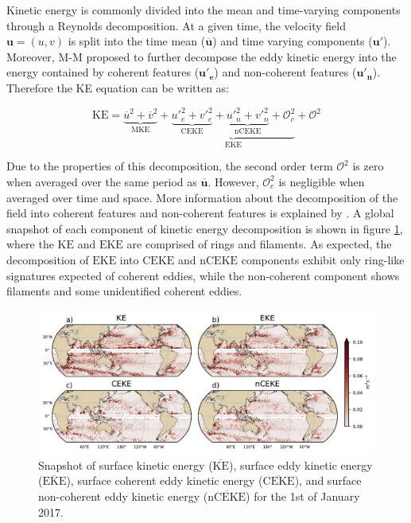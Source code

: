\documentclass[draft,linenumbers]{agujournal2019}
\newcommand{\MKE}{\overline{\textrm{KE}}}
\newcommand{\mKE}{\textrm{MKE}}
\newcommand{\KE}{\textrm{KE}}
\newcommand{\MEKE}{\overline{\textrm{EKE}}}
\newcommand{\EKE}{\textrm{EKE}}
\newcommand{\MCEKE}{\overline{\textrm{CEKE}}}
\newcommand{\CEKE}{\textrm{CEKE}}
\newcommand{\MnCEKE}{\overline{\textrm{nCEKE}}}
\newcommand{\nCEKE}{\textrm{nCEKE}}
\begin{document}
	Kinetic energy is commonly divided into the mean and time-varying components through a Reynolds decomposition. At a given time, the velocity field $\mathbf{u} = (u,v)$ is split into the time mean ($\mathbf{\overline{u}}$) and time varying components ($\mathbf{u'}$). Moreover, M-M proposed to further decompose the eddy kinetic energy into the energy contained by coherent features ($\mathbf{u'_e}$) and non-coherent features ($\mathbf{u'_n}$). Therefore the KE equation can be written as:
	
	\begin{equation}
		\mathrm{KE} = \underbrace{\overline{u}^2 + \overline{v}^2}_{\mKE} + 
		\underbrace{\underbrace{{u'}_e^2+{v'}_e^2}_{\CEKE}  + \underbrace{{u'}_n^2+{v'}_n^2}_{\nCEKE} + \mathcal{O}_c^2 }_{\EKE} + \mathcal{O}^2
	\end{equation}

	Due to the properties of this decomposition, the second order term $\mathcal{O}^2$ is zero when averaged over the same period as $\mathbf{\overline{u}}$. However, $\mathcal{O}_c^2$ is negligible when averaged over time and space. More information about the decomposition of the field into coherent features and non-coherent features is explained by \citet{Martinez_TKE_2019}. A global snapshot of each component of kinetic energy decomposition is shown in figure \ref{fig:eddy_snapshot}, where the $\KE$ and $\EKE$ are comprised of rings and filaments. As expected, the decomposition of $\EKE$ into $\CEKE$ and $\nCEKE$ components exhibit only ring-like signatures expected of coherent eddies, while the non-coherent component shows filaments and some unidentified coherent eddies.

	\begin{figure}
	    \centering
	    \includegraphics[width=1\textwidth]{figures/snapshot_ke_maps_satellite.pdf}
	    \caption{Snapshot of surface kinetic energy ($\MKE$), surface eddy kinetic energy ($\MEKE$), surface coherent eddy kinetic energy ($\MCEKE$), and surface non-coherent eddy kinetic energy ($\MnCEKE$) for the 1st of January 2017.}
	    \label{fig:eddy_snapshot}
	\end{figure}
\end{document}
